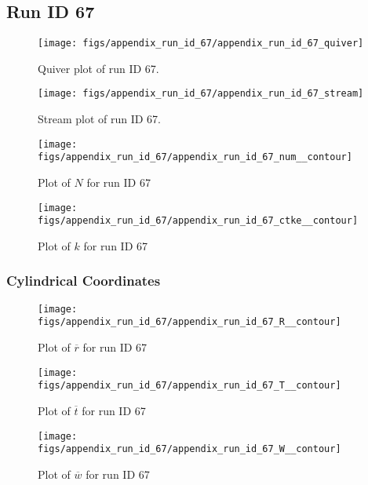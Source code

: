 \subsection{Run ID 67}
\begin{figure}[H]
\centering
\texttt{[image: figs/appendix\_run\_id\_67/appendix\_run\_id\_67\_quiver]}
\caption{Quiver plot of run ID 67.}
\label{fig:appendix_run_id_67_quiver}
\end{figure}


\begin{figure}[H]
\centering
\texttt{[image: figs/appendix\_run\_id\_67/appendix\_run\_id\_67\_stream]}
\caption{Stream plot of run ID 67.}
\label{fig:appendix_run_id_67_stream}
\end{figure}


\begin{figure}[H]
\centering
\texttt{[image: figs/appendix\_run\_id\_67/appendix\_run\_id\_67\_num\_\_contour]}
\caption{Plot of $N$ for run ID 67}
\label{fig:appendix_run_id_67_num__contour}
\end{figure}


\begin{figure}[H]
\centering
\texttt{[image: figs/appendix\_run\_id\_67/appendix\_run\_id\_67\_ctke\_\_contour]}
\caption{Plot of $k$ for run ID 67}
\label{fig:appendix_run_id_67_ctke__contour}
\end{figure}


\subsubsection{Cylindrical Coordinates}
\begin{figure}[H]
\centering
\texttt{[image: figs/appendix\_run\_id\_67/appendix\_run\_id\_67\_R\_\_contour]}
\caption{Plot of $\overline{r}$ for run ID 67}
\label{fig:appendix_run_id_67_R__contour}
\end{figure}


\begin{figure}[H]
\centering
\texttt{[image: figs/appendix\_run\_id\_67/appendix\_run\_id\_67\_T\_\_contour]}
\caption{Plot of $\overline{t}$ for run ID 67}
\label{fig:appendix_run_id_67_T__contour}
\end{figure}


\begin{figure}[H]
\centering
\texttt{[image: figs/appendix\_run\_id\_67/appendix\_run\_id\_67\_W\_\_contour]}
\caption{Plot of $\overline{w}$ for run ID 67}
\label{fig:appendix_run_id_67_W__contour}
\end{figure}


